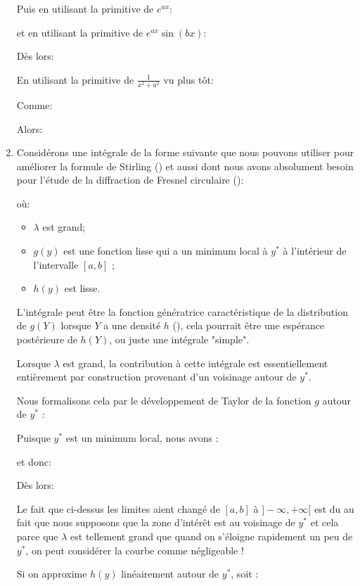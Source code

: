 \begin{enumerate}
	Puis en utilisant la primitive de $e^{ax}$:
	
	et en utilisant la primitive de $e^{ax}\sin(bx)$:
	
	Dès lors:

	En utilisant la primitive de $\frac{1}{x^2+a^2}$ vu plus tôt:
	
	Comme:
	
	Alors:
	
		
		\item Considérons une intégrale de la forme suivante que nous pouvons utiliser pour améliorer la formule de Stirling () et aussi dont nous avons absolument besoin pour l'étude de la diffraction de Fresnel circulaire ():
		
		où:
		\begin{itemize}
			\item $\lambda$ est grand;
			\item $g(y)$ est une fonction lisse qui a un minimum local à $y^*$ à l'intérieur de l'intervalle $[a, b]$ ;
			\item $h(y)$ est lisse.
		\end{itemize}
		L'intégrale peut être la fonction génératrice caractéristique de la distribution de $g(Y)$ lorsque $Y$ a une densité $h$ (), cela pourrait être une espérance postérieure de $h(Y)$, ou juste une intégrale "simple".
		
		Lorsque $\lambda$ est grand, la contribution à cette intégrale est essentiellement entièrement par construction provenant d'un voisinage autour de $y^*$.
		
		Nous formalisons cela par le développement de Taylor de la fonction $g$ autour de $y^*$ :
		
		Puisque $y^*$ est un minimum local, nous avons :
		
		et donc:
		
		Dès lors:
		
		Le fait que ci-dessus les limites aient changé de $[a,b]$ à $]-\infty,+\infty[$ est du au fait que nous supposons que la zone d'intérêt est au voisinage de $y^*$ et cela parce que $\lambda $ est tellement grand que  quand on s'éloigne rapidement un peu de $y^*$, on peut considérer la courbe comme négligeable !
		
		Si on approxime $h(y)$ linéairement autour de $y^*$, soit :
		

\end{enumerate}
